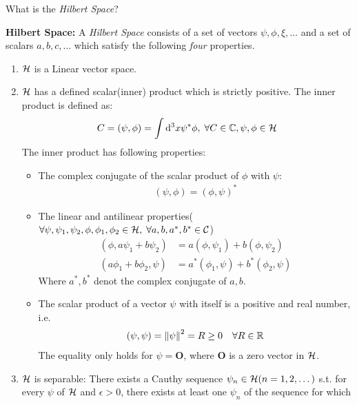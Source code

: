 What is the \textit{Hilbert Space}?
\begin{definition}{\textbf{Hilbert Space:}}\label{def:Hilbertspace}
    A \textit{Hilbert Space} consists of a set of vectors $\psi, \phi, \xi,\dots$ and a set of scalars $a,b,c,\dots$ which satisfy the following \textit{four} properties.
    \begin{enumerate}
        \item $\mathcal{H}$ is a Linear vector space.
        \item $\mathcal{H}$ has a defined scalar(inner) product which is strictly positive. The inner product is defined as:
        \begin{eqnarray}
            C = \left(\psi, \phi\right) = \int \mathrm{d}^3 x \psi^* \phi, \; \forall C \in \mathbb{C}, \psi, \phi \in \mathcal{H} \label{eq:inner_product_R3}
        \end{eqnarray}
        The inner product has following properties:
        \begin{itemize}
            \item The complex conjugate of the scalar product of $\phi$ with $\psi$:
            \begin{eqnarray}
                \left(\psi, \phi\right) = \left(\phi,\psi\right)^*
            \end{eqnarray}
            \item The linear and antilinear properties($\forall \psi,\psi_1,\psi_2,\phi,\phi_1,\phi_2 \in \mathcal{H}, \; \forall a,b,a^*,b^* \in \mathcal{C}$)
            \begin{align}
                \left(\phi, a\psi_1+b\psi_2\right) &= a \left(\phi,\psi_1\right) + b \left(\phi,\psi_2\right) \\
                \left(a\phi_1+b\phi_2,\psi\right) & = a^* \left(\phi_1,\psi\right) + b^* \left(\phi_2,\psi\right)
            \end{align}
            Where $a^*,b^*$ denot the complex conjugate of $a,b$.
            \item The scalar product of a vector $\psi$ with itself is a positive and real number, i.e.
            \begin{eqnarray}
                \left(\psi,\psi\right) = \left\lVert \psi \right\rVert^2 = R \geq 0 \quad \forall R \in \mathbb{R}
            \end{eqnarray}
            The equality only holds for $\psi = \mathbf{O}$, where $\mathbf{O}$ is a zero vector in $\mathcal{H}$.
        \end{itemize}
        \item $\mathcal{H}$ is separable: There exists a Cauthy sequence $\psi_n \in \mathcal{H} (n=1,2,\dots)$ s.t. for every $\psi$ of $\mathcal{H}$ and $\epsilon > 0$, there exists at least one $\psi_n$ of the sequence for which 

\end{enumerate}
\end{definition}
